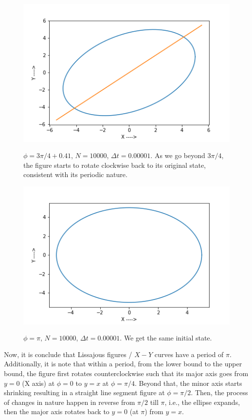 \documentclass{report}
\begin{document}
\begin{figure}[H]
	\centering
	\includegraphics[width = \textwidth]{phiI.png}
	\label{phiI}
	\caption{$\phi=3\pi/4+0.41$, $N=10000$, $\Delta t=0.00001$. As we go beyond $3\pi/4$, the figure starts to rotate clockwise back to its original state, consistent with its periodic nature.}
\end{figure}

\begin{figure}[H]
	\centering
	\includegraphics[width = \textwidth]{phiJ.png}
	\label{phiJ}
	\caption{$\phi=\pi$, $N=10000$, $\Delta t=0.00001$. We get the same initial state.}
\end{figure}

Now, it is conclude that Lissajous figures / $X-Y$ curves have a period of $\pi$. Additionally, it is note that within a period, from the lower bound to the upper bound, the figure first rotates counterclockwise such that its major axis goes from $y=0$ (X axis) at $\phi=0$ to $y=x$ at $\phi=\pi/4$. Beyond that, the minor axis starts shrinking resulting in a straight line segment figure at $\phi=\pi/2$. Then, the process of changes in nature happen in reverse from $\pi/2$ till $\pi$, i.e., the ellipse expands, then the major axis rotates back to $y=0$ (at $\pi$) from $y=x$.
\end{document}
